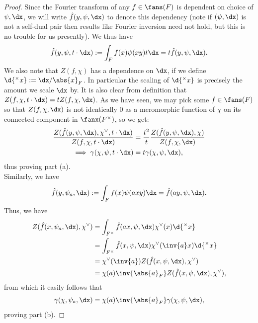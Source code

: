\documentclass[11pt, x11names, openany]{book}
\begin{document}
\begin{proof}
Since the Fourier transform of any $f \in \fans(F)$ is dependent on choice of $\psi, \dx$, we will write $\hat{f}(y, \psi, \dx)$ to denote this dependency (note if $(\psi, \dx)$ is not a self-dual pair then results like Fourier inversion need not hold, but this is no trouble for us presently). We thus have
\begin{equation*}
    \hat{f}(y, \psi, t \cdot \dx) := \int_F f(x) \psi(xy) t \dx = t \hat{f}(y, \psi, \dx).
\end{equation*}
We also note that $Z(f, \chi)$ has a dependence on $\dx$, if we define $\d{^\times x} := \dx/\abs{x}_F$. In particular the scaling of $\d{^\times x}$ is precisely the amount we scale $\dx$ by. It is also clear from definition that $Z(f, \chi, t \cdot \dx) = t Z(f, \chi, \dx)$. As we have seen, we may pick some $f \in \fans(F)$ so that $Z(f, \chi, \dx)$ is not identically 0 as a meromorphic function of $\chi$ on its connected component in $\fanx(F^\times)$, so we get:
\begin{align*}
\frac{Z(\hat{f}(y, \psi, \dx), \chi^\lor, t \cdot \dx)}{Z(f, \chi, t \cdot \dx)} &= \frac{t^2}{t} \frac{Z(\hat{f}(y, \psi, \dx), \chi)}{Z(f, \chi, \dx)}\\
\implies \gamma(\chi, \psi, t \cdot \dx) &= t \gamma(\chi, \psi, \dx),
\end{align*}
thus proving part (a).\\
Similarly, we have
\begin{equation*}
    \hat{f}(y, \psi_a, \dx) := \int_F f(x) \psi(axy) \dx = \hat{f}(ay, \psi, \dx).
\end{equation*}
Thus, we have
\begin{align*}
    Z(\hat{f}(x, \psi_a, \dx), \chi^\lor) &= \int_{F^\times} \hat{f}(ax, \psi, \dx) \chi^\lor(x)\d{^\times x} \\
    &= \int_{F^\times} \hat{f}(x, \psi, \dx)\chi^\lor(\inv{a} x) \d{^\times x}\\
    &= \chi^\lor(\inv{a}) Z(\hat{f}(x, \psi, \dx), \chi^\lor)\\
    &= \chi(a) \inv{\abs{a}_F}Z(\hat{f}(x, \psi, \dx), \chi^\lor),
\end{align*}
from which it easily follows that
\begin{equation*}
    \gamma(\chi, \psi_a, \dx) = \chi(a) \inv{\abs{a}_F} \gamma(\chi, \psi, \dx),
\end{equation*}
proving part (b).
\end{proof}
\end{document}
